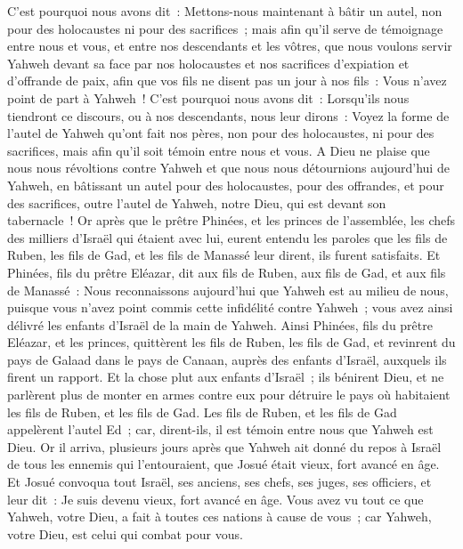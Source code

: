 \begin{multicols}{2}
C'est pourquoi nous avons dit~: Mettons-nous maintenant à bâtir un autel, non pour des holocaustes ni pour des sacrifices~;
mais afin qu'il serve de témoignage entre nous et vous, et entre nos descendants et les vôtres, que nous voulons servir Yahweh devant sa face par nos holocaustes et nos sacrifices d'expiation et d'offrande de paix, afin que vos fils ne disent pas un jour à nos fils~: Vous n'avez point de part à Yahweh~!
C'est pourquoi nous avons dit~: Lorsqu'ils nous tiendront ce discours, ou à nos descendants, nous leur dirons~: Voyez la forme de l'autel de Yahweh qu'ont fait nos pères, non pour des holocaustes, ni pour des sacrifices, mais afin qu'il soit témoin entre nous et vous.
A Dieu ne plaise que nous nous révoltions contre Yahweh et que nous nous détournions aujourd'hui de Yahweh, en bâtissant un autel pour des holocaustes, pour des offrandes, et pour des sacrifices, outre l'autel de Yahweh, notre Dieu, qui est devant son tabernacle~!
Or après que le prêtre Phinées, et les princes de l'assemblée, les chefs des milliers d'Israël qui étaient avec lui, eurent entendu les paroles que les fils de Ruben, les fils de Gad, et les fils de Manassé leur dirent, ils furent satisfaits.
Et Phinées, fils du prêtre Eléazar, dit aux fils de Ruben, aux fils de Gad, et aux fils de Manassé~: Nous reconnaissons aujourd'hui que Yahweh est au milieu de nous, puisque vous n'avez point commis cette infidélité contre Yahweh~; vous avez ainsi délivré les enfants d'Israël de la main de Yahweh.
Ainsi Phinées, fils du prêtre Eléazar, et les princes, quittèrent les fils de Ruben, les fils de Gad, et revinrent du pays de Galaad dans le pays de Canaan, auprès des enfants d'Israël, auxquels ils firent un rapport.
Et la chose plut aux enfants d'Israël~; ils bénirent Dieu, et ne parlèrent plus de monter en armes contre eux pour détruire le pays où habitaient les fils de Ruben, et les fils de Gad.
Les fils de Ruben, et les fils de Gad appelèrent l'autel Ed~; car, dirent-ils, il est témoin entre nous que Yahweh est Dieu.
\VerseOne{}Or il arriva, plusieurs jours après que Yahweh ait donné du repos à Israël de tous les ennemis qui l'entouraient, que Josué était vieux, fort avancé en âge.
Et Josué convoqua tout Israël, ses anciens, ses chefs, ses juges, ses officiers, et leur dit~: Je suis devenu vieux, fort avancé en âge.
Vous avez vu tout ce que Yahweh, votre Dieu, a fait à toutes ces nations à cause de vous~; car Yahweh, votre Dieu, est celui qui combat pour vous.

\end{multicols}
